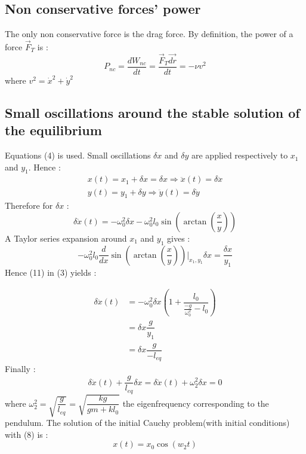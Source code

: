 \subsection{Non conservative forces' power}
	The only non conservative force is the drag force. By definition, the 			power of a force $\vec{F}_T$ is : 
	\begin{equation}
	P_{nc}=\dfrac{dW_{nc}}{dt} =\dfrac{\vec{F}_T\vec{dr}}{dt}=-\nu v^2
	\end{equation}
	where $v^2=\dot{x}^2 + \dot{y}^2$
\subsection{Small oscillations around the stable solution of the equilibrium}
	Equations (4) is used. Small oscillations $\delta x$ and $\delta y$ are 		applied respectively to $x_1$ and $y_1$. Hence : 
	\begin{gather}
	x(t)=x_1 + \delta x=\delta x \Rightarrow \ddot{x}(t)=\delta\ddot{x}\\
	y(t)=y_1 + \delta y \Rightarrow \ddot{y}(t)=\delta\ddot{y}
	\end{gather}
	Therefore for $\delta x$ : 
	\begin{equation}
	\delta\ddot{x}(t)=-\omega_0^2\delta x - \omega_0^2l_0\sin\left(\arctan\left(\dfrac{x}{y}\right)\right)
	\end{equation}
	A Taylor series expansion around  $x_1$ and $y_1$ gives : 
	\begin{equation}
	-\omega_0^2l_0\frac{d}{dx}\sin\left(\arctan\left(\dfrac{x}{y}\right)\right)\bigg\rvert_{x_1,y_1}\delta x = \frac{\delta x}{y_1}
	\end{equation}
	Hence (11) in (3) yields : 

	\begin{align*}
	\delta\ddot{x}(t)&=-\omega_0^2\delta x\left(1+\dfrac{l_0}{\frac{-g}{\omega_0^2}-l_0}\right)\\
	&=\delta x \dfrac{g}{y_1}\\
	&=\delta x \dfrac{g}{-l_{eq}}
	\end{align*}
	Finally : 
	\begin{equation}
	\delta \ddot{x}(t)+\dfrac{g}{l_{eq}}\delta x=\delta \ddot{x}(t)+\omega_2^2\delta x=0
	\end{equation}
	where $\omega_2^2=\sqrt{\dfrac{g}{l_{eq}}}=\sqrt{\dfrac{kg}{gm+kl_0}}$ the eigenfrequency corresponding to the pendulum. The solution of the initial Cauchy problem(with initial conditions) with (8) is : 
	\begin{equation}
		x(t)=x_0\cos(w_2t)
	\end{equation} 
	
